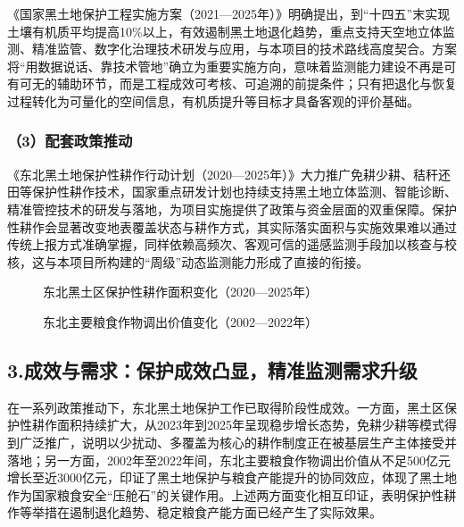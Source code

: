 《国家黑土地保护工程实施方案（2021—2025年）》明确提出，到“十四五”末实现土壤有机质平均提高10\%以上，有效遏制黑土地退化趋势，重点支持天空地立体监测、精准监管、数字化治理技术研发与应用，与本项目的技术路线高度契合。方案将“用数据说话、靠技术管地”确立为重要实施方向，意味着监测能力建设不再是可有可无的辅助环节，而是工程成效可考核、可追溯的前提条件；只有把退化与恢复过程转化为可量化的空间信息，有机质提升等目标才具备客观的评价基础。

\subsubsection{（3）配套政策推动}

《东北黑土地保护性耕作行动计划（2020—2025年）》大力推广免耕少耕、秸秆还田等保护性耕作技术，国家重点研发计划也持续支持黑土地立体监测、智能诊断、精准管控技术的研发与落地，为项目实施提供了政策与资金层面的双重保障。保护性耕作会显著改变地表覆盖状态与耕作方式，其实际落实面积与实施效果难以通过传统上报方式准确掌握，同样依赖高频次、客观可信的遥感监测手段加以核查与校核，这与本项目所构建的“周级”动态监测能力形成了直接的衔接。

\begin{figure}[htbp]
    \centering
    \caption{东北黑土区保护性耕作面积变化（2020—2025年）}
    \label{fig:2}
\end{figure}

\begin{figure}[htbp]
    \centering
    \caption{东北主要粮食作物调出价值变化（2002—2022年）}
    \label{fig:3}
\end{figure}

\subsection{3.成效与需求：保护成效凸显，精准监测需求升级}

在一系列政策推动下，东北黑土地保护工作已取得阶段性成效。一方面，黑土区保护性耕作面积持续扩大，从2023年到2025年呈现稳步增长态势，免耕少耕等模式得到广泛推广，说明以少扰动、多覆盖为核心的耕作制度正在被基层生产主体接受并落地；另一方面，2002年至2022年间，东北主要粮食作物调出价值从不足500亿元增长至近3000亿元，印证了黑土地保护与粮食产能提升的协同效应，体现了黑土地作为国家粮食安全“压舱石”的关键作用。上述两方面变化相互印证，表明保护性耕作等举措在遏制退化趋势、稳定粮食产能方面已经产生了实际效果。

